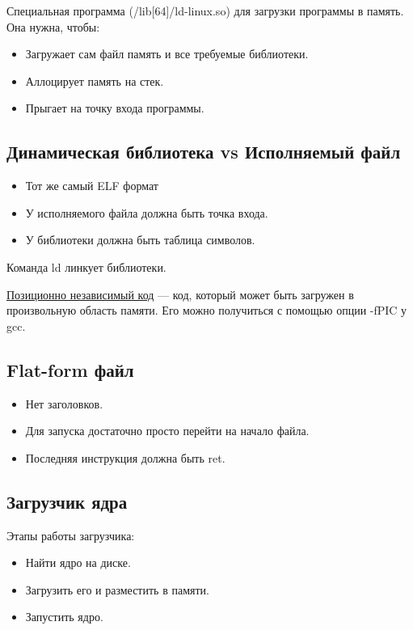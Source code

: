 Специальная программа (/lib[64]/ld-linux.so) для загрузки программы в память. 
Она нужна, чтобы:
\begin{itemize}
	\item Загружает сам файл память и все требуемые библиотеки.
	\item Аллоцирует память на стек.
	\item Прыгает на точку входа программы.
\end{itemize}

\subsection{Динамическая библиотека vs Исполняемый файл}

\begin{itemize}
	\item Тот же самый ELF формат
	\item У исполняемого файла должна быть точка входа.
	\item У библиотеки должна быть таблица символов.
\end{itemize}

Команда ld линкует библиотеки.

\begin{Def}
	\underline{Позиционно независимый код} --- код, который может быть загружен в произвольную область памяти. Его можно получиться с помощью опции -fPIC у gcc.
\end{Def}

\subsection{Flat-form файл}

\begin{itemize}
	\item Нет заголовков.
	\item Для запуска достаточно просто перейти на начало файла.
	\item Последняя инструкция должна быть ret.
\end{itemize}

\subsection{Загрузчик ядра}

Этапы работы загрузчика:
\begin{itemize}
	\item Найти ядро на диске.
	\item Загрузить его и разместить в памяти.
	\item Запустить ядро.
\end{itemize}

